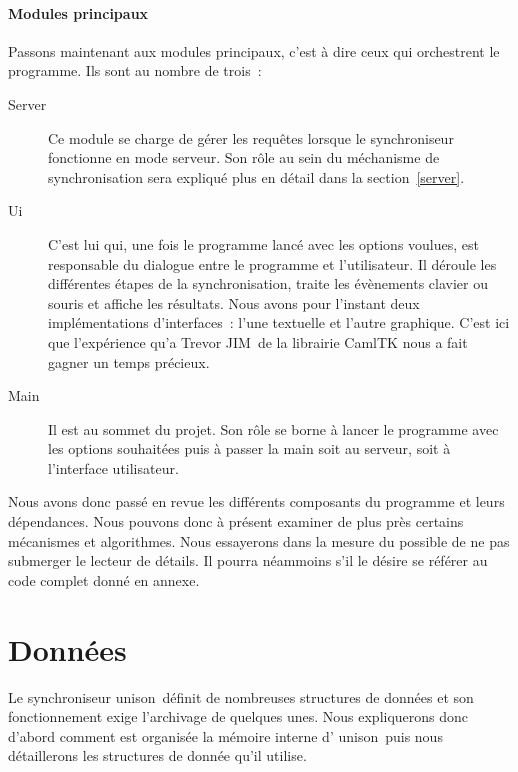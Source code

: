 \documentclass[11pt]{report}
\newcommand{\trevor}{Trevor JIM}
\newcommand{\unison}{unison}
\begin{document}
{\paragraph{Modules principaux\\}
Passons maintenant aux modules principaux, c'est \`a dire ceux qui 
orchestrent le programme. Ils sont au nombre de trois~:
\begin{description}
\item [Server] Ce module se charge de g\'erer les requ\^etes lorsque le
  synchroniseur fonctionne en mode serveur.
Son r\^ole au sein du m\'echanisme de synchronisation sera expliqu\'e plus
en d\'etail dans la section~\ref{server}.
\item [Ui] C'est lui qui, une fois le programme lanc\'e avec les
  options voulues, est responsable du dialogue entre le programme et 
l'utilisateur.
Il d\'eroule les diff\'erentes \'etapes de la 
synchronisation, traite les \'ev\`enements clavier ou souris et affiche les
r\'esultats. Nous avons pour l'instant deux impl\'ementations d'interfaces~:
l'une textuelle et l'autre graphique. C'est ici que l'exp\'erience
qu'a \trevor\ de la librairie CamlTK nous a fait gagner un temps 
pr\'ecieux.
\item [Main] Il est au sommet du projet. Son r\^ole se borne \`a lancer le
programme avec les options souhait\'ees puis \`a passer la main soit au 
serveur, soit \`a l'interface utilisateur. 
\end{description}
Nous avons donc pass\'e en revue les diff\'erents composants du programme 
et leurs d\'ependances. Nous pouvons donc \`a pr\'esent examiner de plus 
pr\`es certains m\'ecanismes et algorithmes. Nous essayerons dans la mesure 
du possible de ne pas submerger le lecteur de d\'etails. Il pourra 
n\'eammoins s'il le d\'esire se r\'ef\'erer au code complet donn\'e en 
annexe.
\section{Donn\'ees}
Le synchroniseur \unison\ d\'efinit de nombreuses structures de donn\'ees
et son fonctionnement exige l'archivage de quelques unes. Nous expliquerons
donc d'abord comment est organis\'ee la m\'emoire interne d' \unison\ puis 
nous d\'etaillerons les structures de donn\'ee qu'il utilise.
}
\end{document}
